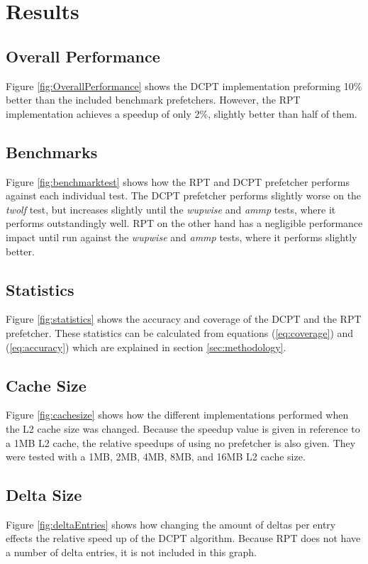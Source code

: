 \section{Results}\label{sec:results}
 
\subsection{Overall Performance}
    Figure \ref{fig:OverallPerformance} shows the DCPT implementation preforming 10\% better than the included benchmark prefetchers. However, the RPT implementation achieves a speedup of only 2\%, slightly better than half of them.
    

\subsection{Benchmarks}
    Figure \ref{fig:benchmarktest} shows how the RPT and DCPT prefetcher performs against each individual test. The DCPT prefetcher performs slightly worse on the \emph{twolf} test, but increases slightly until the \emph{wupwise} and \emph{ammp} tests, where it performs outstandingly well. RPT on the other hand has a negligible performance impact until run against the \emph{wupwise} and \emph{ammp} tests, where it performs slightly better.
    

\subsection{Statistics}
    Figure \ref{fig:statistics} shows the accuracy and coverage of the DCPT and the RPT prefetcher. These statistics can be calculated from equations (\ref{eq:coverage}) and (\ref{eq:accuracy}) which are explained in section \ref{sec:methodology}.
    

\subsection{Cache Size}
    Figure \ref{fig:cachesize} shows how the different implementations performed when the L2 cache size was changed. Because the speedup value is given in reference to a 1MB L2 cache, the relative speedups of using no prefetcher is also given. They were tested with a 1MB, 2MB, 4MB, 8MB, and 16MB L2 cache size. 
    
    
\subsection{Delta Size}
    Figure \ref{fig:deltaEntries} shows how changing the amount of deltas per entry effects the relative speed up of the DCPT algorithm. Because RPT does not have a number of delta entries, it is not included in this graph.
    